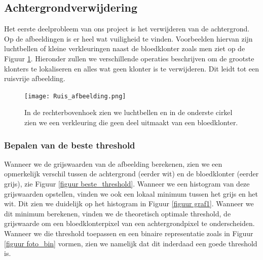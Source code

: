\documentclass[a4paper,kulak]{kulakarticle}
\begin{document}
	\subsection{Achtergrondverwijdering}
	Het eerste deelprobleem van ons project is het verwijderen van de achtergrond. Op de afbeeldingen is er heel wat vuiligheid te vinden. Voorbeelden hiervan zijn luchtbellen of kleine verkleuringen naast de bloedklonter zoals men ziet op de Figuur \ref{figuur achtergrondverwijdering}. Hieronder zullen we verschillende operaties beschrijven om de grootste klonters te lokaliseren en alles wat geen klonter is te verwijderen. Dit leidt tot een ruisvrije afbeelding.
	
	\begin{figure}[H]
		\centering
		\texttt{[image: Ruis\_afbeelding.png]}	
		\caption{In de rechterbovenhoek zien we luchtbellen en in de onderste cirkel zien we een verkleuring die geen deel uitmaakt van een bloedklonter.}
		\label{figuur achtergrondverwijdering}
	\end{figure}

	\subsubsection{Bepalen van de beste threshold}
	Wanneer we de grijswaarden van de afbeelding berekenen, zien we een opmerkelijk verschil tussen de achtergrond (eerder wit) en de bloedklonter (eerder grijs),  zie Figuur \ref{figuur beste_threshold}. Wanneer we een histogram van deze grijswaarden opstellen, vinden we ook een lokaal minimum tussen het grijs en het wit. Dit zien we duidelijk op het histogram in Figuur \ref{figuur graf1}. Wanneer we dit minimum berekenen, vinden we de theoretisch optimale threshold, de grijswaarde om een bloedklonterpixel van een achtergrondpixel te onderscheiden. Wanneer we die threshold toepassen en een binaire representatie zoals in Figuur \ref{figuur foto_bin} vormen, zien we namelijk dat dit inderdaad een goede threshold is.
	
\end{document}

